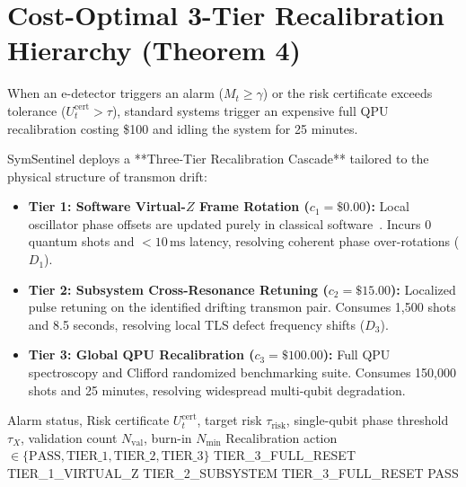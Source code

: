 \documentclass[aps,pra,twocolumn,superscriptaddress,10pt,floatfix]{revtex4-2}
\begin{document}
\section{Cost-Optimal 3-Tier Recalibration Hierarchy (Theorem 4)}
\label{sec:control}
When an e-detector triggers an alarm ($M_t \ge \gamma$) or the risk certificate exceeds tolerance ($U_t^{\mathrm{cert}} > \tau$), standard systems trigger an expensive full QPU recalibration costing \$100 and idling the system for 25 minutes.

SymSentinel deploys a **Three-Tier Recalibration Cascade** tailored to the physical structure of transmon drift:
\begin{itemize}
    \item \textbf{Tier 1: Software Virtual-$Z$ Frame Rotation ($c_1 = \$0.00$):} Local oscillator phase offsets are updated purely in classical software~\cite{mckay2017efficient}. Incurs 0 quantum shots and $< 10\,\text{ms}$ latency, resolving coherent phase over-rotations ($D_1$).
    \item \textbf{Tier 2: Subsystem Cross-Resonance Retuning ($c_2 = \$15.00$):} Localized pulse retuning on the identified drifting transmon pair. Consumes 1,500 shots and 8.5 seconds, resolving local TLS defect frequency shifts ($D_3$).
    \item \textbf{Tier 3: Global QPU Recalibration ($c_3 = \$100.00$):} Full QPU spectroscopy and Clifford randomized benchmarking suite. Consumes 150,000 shots and 25 minutes, resolving widespread multi-qubit degradation.
\end{itemize}

\begin{algorithm}[t]
\caption{Three-Tier Cascade Recalibration Controller}
\label{alg:cascade}
\begin{algorithmic}[1]
\Require Alarm status, Risk certificate $U_t^{\mathrm{cert}}$, target risk $\tau_{\mathrm{risk}}$, single-qubit phase threshold $\tau_X$, validation count $N_{\mathrm{val}}$, burn-in $N_{\mathrm{min}}$
\Ensure Recalibration action $\in \{\text{PASS}, \text{TIER\_1}, \text{TIER\_2}, \text{TIER\_3}\}$
    \State \Return TIER\_3\_FULL\_RESET 
        \State \Return TIER\_1\_VIRTUAL\_Z 
        \State \Return TIER\_2\_SUBSYSTEM 
    \Else
        \State \Return TIER\_3\_FULL\_RESET 
    \EndIf
\Else
    \State \Return PASS 
\EndIf
\end{algorithmic}
\end{algorithm}
\end{document}
